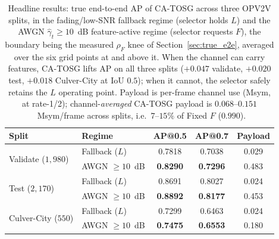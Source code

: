 \documentclass[journal]{IEEEtran}
\newcommand{\method}{CA-TOSG}
\begin{document}
\begin{table}[t]
\centering
\caption{Headline results: true end-to-end AP of \method{} across three OPV2V splits, in the fading/low-SNR fallback regime (selector holds $L$) and the AWGN $\hat\gamma_t\ge10$~dB feature-active regime (selector requests $F$), the boundary being the measured $\rho_F$ knee of Section~\ref{sec:true_e2e}, averaged over the six grid points at and above it. When the channel can carry features, \method{} lifts AP on all three splits ($+0.047$ validate, $+0.020$ test, $+0.018$ Culver-City at IoU $0.5$); when it cannot, the selector safely retains the $L$ operating point. Payload is per-frame channel use (Msym, at rate-1/2); channel-\emph{averaged} \method{} payload is $0.068$--$0.151$~Msym/frame across splits, i.e.\ $7$--$15\%$ of Fixed $F$ ($0.990$).}
\label{tab:headline}
\begin{tabular}{llccc}
\toprule
Split & Regime & AP@0.5 & AP@0.7 & Payload \\
\midrule
\multirow{2}{*}{Validate ($1{,}980$)}
  & Fallback ($L$)   & 0.7818 & 0.7038 & 0.029 \\
  & AWGN $\ge10$~dB & \textbf{0.8290} & \textbf{0.7296} & 0.483 \\
\midrule
\multirow{2}{*}{Test ($2{,}170$)}
  & Fallback ($L$)   & 0.8691 & 0.8027 & 0.024 \\
  & AWGN $\ge10$~dB & \textbf{0.8892} & \textbf{0.8177} & 0.453 \\
\midrule
\multirow{2}{*}{Culver-City ($550$)}
  & Fallback ($L$)   & 0.7299 & 0.6463 & 0.024 \\
  & AWGN $\ge10$~dB & \textbf{0.7475} & \textbf{0.6553} & 0.180 \\
\bottomrule
\end{tabular}
\end{table}
\end{document}
